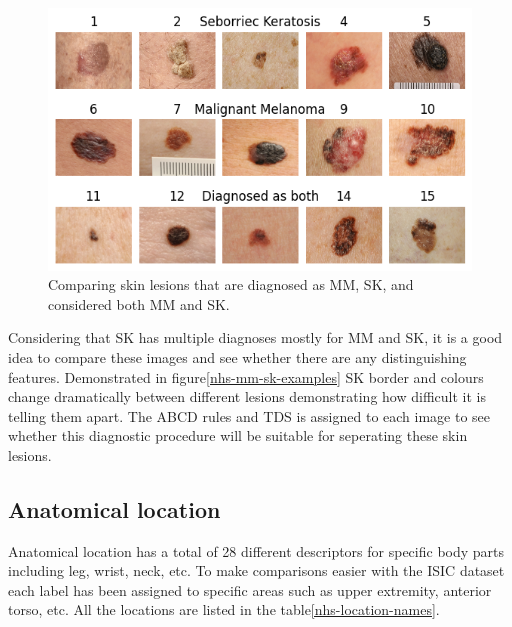\begin{figure}
    \centering
    \includegraphics[scale=0.75]{images/nhs/nhs-mm-sk-examples.png}
    \caption{Comparing skin lesions that are diagnosed as MM, SK, and considered both MM and SK.} 
\end{figure}\label{nhs-mm-sk-examples}

Considering that SK has multiple diagnoses mostly for MM and SK, it is a good idea to compare these images and see whether there are any distinguishing features. Demonstrated in figure\ref{nhs-mm-sk-examples} SK border and colours change dramatically between different lesions demonstrating how difficult it is telling them apart\cite{}. The ABCD rules and TDS is assigned to each image to see whether this diagnostic procedure will be suitable for seperating these skin lesions. 

\subsection{Anatomical location}

Anatomical location has a total of 28 different descriptors for specific body parts including leg, wrist, neck, etc. To make comparisons easier with the ISIC dataset each label has been assigned to specific areas such as upper extremity, anterior torso, etc. All the locations are listed in the table\ref{nhs-location-names}. 


